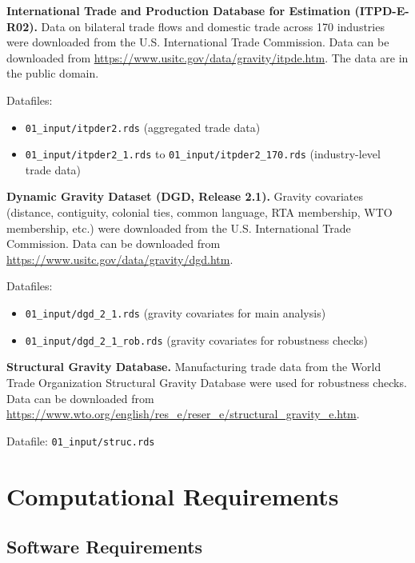 \documentclass[12pt]{article}
\begin{document}
\textbf{International Trade and Production Database for Estimation (ITPD-E-R02).} Data on bilateral trade flows and domestic trade across 170 industries were downloaded from the U.S. International Trade Commission. Data can be downloaded from \url{https://www.usitc.gov/data/gravity/itpde.htm}. The data are in the public domain.

Datafiles:
\begin{itemize}
	\item \texttt{01\_input/itpder2.rds} (aggregated trade data)
	\item \texttt{01\_input/itpder2\_1.rds} to \texttt{01\_input/itpder2\_170.rds} (industry-level trade data)
\end{itemize}

\textbf{Dynamic Gravity Dataset (DGD, Release 2.1).} Gravity covariates (distance, contiguity, colonial ties, common language, RTA membership, WTO membership, etc.) were downloaded from the U.S. International Trade Commission. Data can be downloaded from \url{https://www.usitc.gov/data/gravity/dgd.htm}.

Datafiles:
\begin{itemize}
	\item \texttt{01\_input/dgd\_2\_1.rds} (gravity covariates for main analysis)
	\item \texttt{01\_input/dgd\_2\_1\_rob.rds} (gravity covariates for robustness checks)
\end{itemize}

\textbf{Structural Gravity Database.} Manufacturing trade data from the World Trade Organization Structural Gravity Database were used for robustness checks. Data can be downloaded from \url{https://www.wto.org/english/res_e/reser_e/structural_gravity_e.htm}.

Datafile: \texttt{01\_input/struc.rds}

\section{Computational Requirements}

\subsection{Software Requirements}
\end{document}

